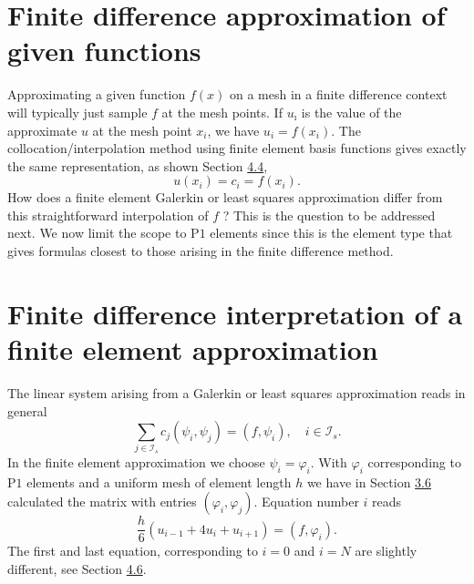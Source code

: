 \documentclass[../main.tex]{subfiles}
\begin{document}
\section[Finite difference approximation of given functions]{Finite difference approximation of given functions}
\label{sec:sec_5_1}
Approximating a given function $f(x)$ on a mesh in a finite difference context will typically just sample $f$ at the mesh points. If $u_{\imath}$ is the value of the approximate $u$ at the mesh point $x_{i}$, we have $u_{i}=f\left(x_{i}\right)$. The collocation/interpolation method using finite element basis functions gives exactly the same representation, as shown Section \hyperref[sec:sec_4_4]{4.4},
$$
u\left(x_{i}\right)=c_{i}=f\left(x_{i}\right) .
$$
How does a finite element Galerkin or least squares approximation differ from this straightforward interpolation of $f$ ? This is the question to be addressed next. We now limit the scope to $\mathrm{P} 1$ elements since this is the element type that gives formulas closest to those arising in the finite difference method.
\section[Finite difference interpretation of a finite element approximation]{Finite difference interpretation of a finite element approximation}
\label{sec:sec_5_2}
The linear system arising from a Galerkin or least squares approximation reads in general
$$
\sum_{j \in \mathcal{I}_{s}} c_{j}\left(\psi_{i}, \psi_{j}\right)=\left(f, \psi_{i}\right), \quad i \in \mathcal{I}_{s}.
$$
In the finite element approximation we choose $\psi_{i}=\varphi_{i}$. With $\varphi_{i}$ corresponding to $\mathrm{P} 1$ elements and a uniform mesh of element length $h$ we have in Section \hyperref[sec:sec_3_6]{3.6} calculated the matrix with entries $\left(\varphi_{i}, \varphi_{j}\right)$. Equation number $i$ reads
\begin{equation}\label{eqa84}
	\frac{h}{6}\left(u_{i-1}+4 u_{i}+u_{i+1}\right)=\left(f, \varphi_{i}\right).
\end{equation}
The first and last equation, corresponding to $i=0$ and $i=N$ are slightly different, see Section \hyperref[sec:sec_4_6]{4.6}.
\end{document}
